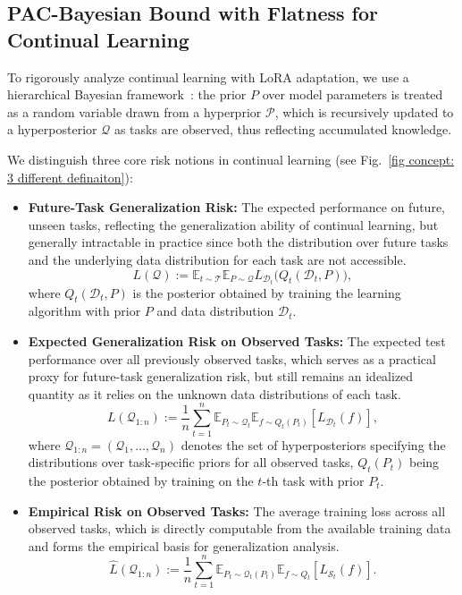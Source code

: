 \documentclass[letterpaper]{article} %
\begin{document}
\subsection{PAC-Bayesian Bound with Flatness for Continual Learning}




To rigorously analyze continual learning with LoRA adaptation, we use a hierarchical Bayesian framework~\cite{pentinaPACBayesianBoundLifelong2014}: the prior $P$ over model parameters is treated as a random variable drawn from a hyperprior $\mathcal{P}$, which is recursively updated to a hyperposterior $\mathcal{Q}$ as tasks are observed, thus reflecting accumulated knowledge.


We distinguish three core risk notions in continual learning (see Fig.~\ref{fig concept: 3 different definaiton}):
\begin{itemize}
    \item \textbf{Future-Task Generalization Risk:} The expected performance on future, unseen tasks, reflecting the generalization ability of continual learning, but generally intractable in practice since both the distribution over future tasks and the underlying data distribution for each task are not accessible.
    \begin{equation}
        L(\mathcal{Q}) := \mathbb{E}_{t \sim \mathcal{T}}\mathbb{E}_{P \sim \mathcal{Q}}L_{\mathcal{D}_t}\big(Q_t(\mathcal{D}_t, P)\big),
    \end{equation}
    where $Q_t(\mathcal{D}_t, P )$ is the posterior obtained by training the learning algorithm with prior $P$ and data distribution $\mathcal{D}_t$.
    \item \textbf{Expected Generalization Risk on Observed Tasks:}  The expected test performance over all previously observed tasks, which serves as a practical proxy for future-task generalization risk, but still remains an idealized quantity as it relies on the unknown data distributions of each task.
    \begin{equation}
        L(\mathcal{Q}_{1:n}) := \frac{1}{n} \sum_{t=1}^n \mathbb{E}_{P_{t} \sim \mathcal{Q}_{t}} \mathbb{E}_{f \sim Q_t(P_t)} [ L_{\mathcal{D}_t}(f) ],
    \end{equation}
    where  $\mathcal{Q}_{1:n} = (\mathcal{Q}_1, \ldots, \mathcal{Q}_n)$ denotes the set of hyperposteriors specifying the distributions over task-specific priors for all observed tasks, $Q_t(P_t)$ being the posterior obtained by training on the $t$-th task with prior $P_t$.
    \item \textbf{Empirical Risk on Observed Tasks:} The average training loss across all observed tasks, which is directly computable from the available training data and forms the empirical basis for generalization analysis.
    \begin{equation}
        \hat{L}(\mathcal{Q}_{1:n}) := \frac{1}{n} \sum_{t=1}^n \mathbb{E}_{P_t \sim \mathcal{Q}_t(P_t)} \mathbb{E}_{f \sim Q_t}  [ L_{\mathcal{S}_t}(f) ].
    \end{equation}
\end{itemize}
\end{document}
